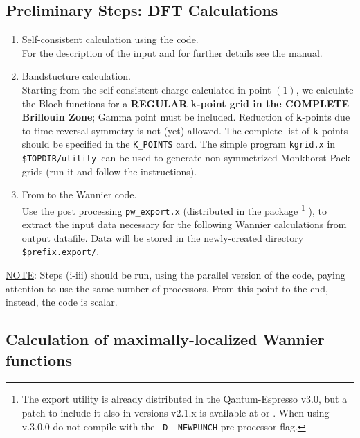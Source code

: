 \subsection{Preliminary Steps: DFT
Calculations}\label{subsection:run_dft}
\renewcommand{\theenumi}{\roman{enumi}}
\renewcommand{\labelenumi}{\theenumi)}
\begin{enumerate}
%
\item Self-consistent calculation using the \PWSCF code.\\
      \noindent For the description of the input and for further details see the \PWSCF
      manual.
\item Bandstucture calculation.\\
      \noindent  Starting from the self-consistent charge
      calculated in point $(1)$, we calculate the Bloch functions for a
      {\bf REGULAR {\bf k}-point grid in the COMPLETE Brillouin Zone}; Gamma point
      must be included. Reduction of \textbf{k}-points due to time-reversal
      symmetry is not (yet) allowed. The complete list of
      \textbf{k}-points should be specified in the {\tt K\_POINTS} card.
      The simple program
      {\tt kgrid.x} in {\tt \$TOPDIR/utility }can be used to generate non-symmetrized
      Monkhorst-Pack grids (run it and follow the instructions).
\item From \PWSCF to the Wannier code.\\
      \noindent Use the post processing
      {\tt pw\_export.x} (distributed in the \PWSCF package
      \footnote{The export utility is already distributed in the
      Qantum-Espresso v3.0, but a patch to include it also in versions v2.1.x is
      available at \WANTURL{} or \PWSCFURL{}. When using v.3.0.0 do not compile with
      the {\tt -D\_\_NEWPUNCH} pre-processor flag.}
      ),
      to extract the input data necessary for the following Wannier
      calculations
      from \PWSCF output datafile. Data will be stored in the
      newly-created directory {\tt \$prefix.export/}.
\end{enumerate}

\noindent \underline{NOTE}: Steps (i-iii) should be run, using the
parallel version of the code, paying attention to use the same
number of processors. From this point to the end, instead, the
code is scalar.

\subsection {Calculation of maximally-localized Wannier
functions}\label{subsection:run_wannier}

